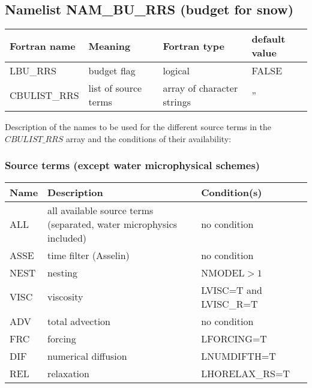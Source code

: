 \subsection{Namelist NAM\_BU\_RRS (budget for snow)}

\begin{longtable} {|p{}|p{}|>{\centering}p{}|p{}<{\centering}|}
\hline
Fortran name & Meaning & Fortran type & default value \\
\hline \hline
\endhead
LBU\_RRS & budget flag & logical & FALSE\index{LBU\_RRS!\innam{NAM\_BU\_RRS}} \\\hline
CBULIST\_RRS & list of source terms & array of character strings & ''\index{CBULIST\_RRS!\innam{NAM\_BU\_RRS}} \\\hline
\end{longtable}

Description of the names to be used for the different source terms in the $CBULIST\_RRS$ array and the conditions of their availability:

\subsubsection{Source terms (except water microphysical schemes)}

\begin{longtable} {|p{}|p{}|p{}|}
\hline
Name & Description & Condition(s) \\
\hline \hline
\endhead
ALL    & all available source terms (separated,  water microphysics included) & no condition \\\hline \hline
ASSE   & time filter (Asselin) & no condition           \\\hline
NEST   & nesting               & NMODEL$>1$             \\\hline
VISC   & viscosity             & LVISC=T and LVISC\_R=T \\\hline
ADV    & total advection       & no condition           \\\hline
FRC    & forcing               & LFORCING=T             \\\hline
DIF    & numerical diffusion   & LNUMDIFTH=T            \\\hline
REL    & relaxation            & LHORELAX\_RS=T         \\\hline
\end{longtable}

